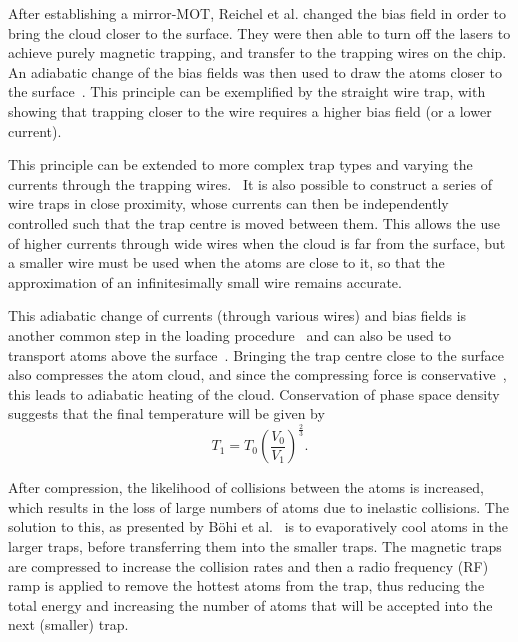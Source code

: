 After establishing a mirror-MOT, Reichel et al. changed the bias field in order
to bring the cloud closer to the surface. They were then able to turn off the lasers
to achieve purely magnetic trapping, and transfer to the trapping wires on the
chip.
An adiabatic change of the bias fields was then used to
draw the atoms closer to the surface~\cite{Reichel1999, Folman2000}. This
principle can be exemplified by the straight wire trap, with
 showing that trapping closer to the wire requires a
higher bias field (or a lower current).

This principle can be extended to more complex trap types and varying the
currents through the trapping wires.~\cite{Folman2000} It is also possible to
construct a series of wire traps in close proximity, whose currents can then be
independently controlled such that the trap centre is moved between them. This
allows the use of higher currents through wide wires when the cloud is far from
the surface, but a smaller wire must be used when the atoms are close to it, so
that the approximation of an infinitesimally small wire remains accurate.

This adiabatic change of currents (through various wires) and bias fields is
another common step in the loading procedure~\cite{Folman2000,2011Ac,
RevModPhys.79.235} and can also be used to transport atoms above the
surface~\cite{Reichel1999, Schwindt2005}. Bringing the trap centre close to the
surface also compresses the atom cloud, and since the compressing force is
conservative~\cite{Metcalf1999}, this leads to adiabatic heating of the cloud.
Conservation of phase space density suggests that the final temperature will be
given by~\cite{Metcalf1999}
%
\begin{equation}
   T_1 = T_0\left(\frac{V_0}{V_1}\right)^\frac{2}{3}.
\end{equation}

After compression, the likelihood of collisions between the atoms is increased,
which results in the loss of large numbers of atoms due to inelastic collisions.
The solution to this, as presented by B\"ohi et al.~\cite{Boehi2009} is to
evaporatively cool atoms in the larger traps, before transferring them into the
smaller traps. The magnetic traps are compressed to increase the collision
rates and then a radio frequency (RF) ramp is applied to remove the hottest
atoms from the trap, thus reducing the total energy and increasing the number of
atoms that will be accepted into the next (smaller) trap.~\cite{Foot2005,
Metcalf1999}

